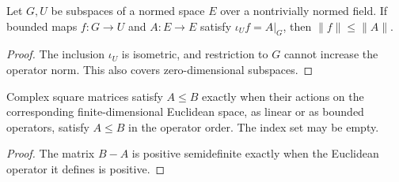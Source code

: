 \begin{theorem}
    \label{thm:restricted_map_ambient_norm}
    \leanok
    Let $G,U$ be subspaces of a normed space $E$ over a nontrivially
    normed field. If bounded maps $f:G\to U$ and $A:E\to E$ satisfy
    $\iota_Uf=A|_G$, then $\|f\|\le\|A\|$.
\end{theorem}
\begin{proof}
    \leanok
    The inclusion $\iota_U$ is isometric, and restriction to $G$ cannot
    increase the operator norm. This also covers zero-dimensional subspaces.
\end{proof}

\begin{theorem}
    \label{thm:matrix_euclidean_order}
    \leanok
    Complex square matrices satisfy $A\le B$ exactly when their actions on the
    corresponding finite-dimensional Euclidean space, as linear or as bounded
    operators, satisfy $A\le B$ in the operator order. The index set may be empty.
\end{theorem}
\begin{proof}
    \leanok
    The matrix $B-A$ is positive semidefinite exactly when the Euclidean
    operator it defines is positive.
\end{proof}
